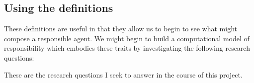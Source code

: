 \subsection{Using the definitions}
These definitions are useful in that they allow us to begin to see what might compose a responsible agent. We might begin to build a computational model of responsibility which embodies these traits by investigating the following research questions:

These are the research questions I seek to answer in the course of this project.
